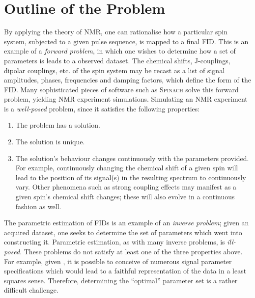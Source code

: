 \section{Outline of the Problem}
\label{sec:theory-outline}
By applying the theory of \ac{NMR}, one can
rationalise how a particular spin system, subjected to a given pulse sequence,
is mapped to a final \ac{FID}. This is an example of a \emph{forward problem},
in which one wishes to determine how a set of parameters is leads to a
observed dataset.
The chemical shifts, J-couplings, dipolar couplings, etc. of the spin system
may be recast as a list of signal amplitudes, phases, frequencies and
damping factors, which define the form of the \ac{FID}.
Many sophisticated pieces of software such as \textsc{Spinach}\cite{Hogben2011}
solve this forward problem, yielding \ac{NMR} experiment simulations.
Simulating an \ac{NMR} experiment is a \emph{well-posed} problem, since it
satisfies the following properties:
\begin{enumerate}
    \item The problem has a solution.
    \item The solution is unique.
    \item The solution's behaviour changes continuously with the parameters
        provided. For example, continuously changing the chemical shift of a
        given spin will lead to the position of its signal(s) in the resulting
        spectrum to continuously vary. Other phenomena such as strong coupling
        effects may manifest as a given spin's chemical shift changes;
        these will also evolve in a continuous fashion as well.
\end{enumerate}
The parametric estimation of \acp{FID} is an example of an \emph{inverse problem};
given an acquired dataset, one seeks to determine the set of parameters which
went into constructing it.
Parametric estimation, as with many inverse problems, is
\emph{ill-posed}\cite{Kabanikhin2008}. These problems do not satisfy at least
one of the three properties above. For example, given , it is possible
to conceive of numerous signal parameter specifications which would lead to a
faithful representation of the data in a least squares sense.
Therefore, determining the ``optimal'' parameter set is a rather difficult
challenge.

